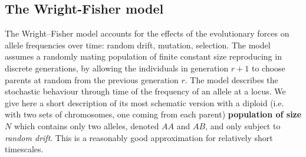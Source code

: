 \documentclass[12pt,mythesisstyle]{report}
\begin{document}
\subsection{The Wright-Fisher model}\label{section: wright-fisher}
The Wright–Fisher model \cite{wright1931} \cite{fisher} \cite{wrightexplained} accounts for the effects of the evolutionary forces on allele frequencies over time: random drift, mutation, selection. The model assumes a randomly mating population of finite constant size reproducing in discrete generations, by allowing the individuals in generation $r + 1$ to choose parents at random from the previous generation $r$. The model describes the stochastic behaviour through time of the frequency of an allele at a locus. We give here a short description of its most schematic version with a diploid (i.e. with two sets of chromosomes, one coming from each parent) \textbf{population of size $N$} which contains only two alleles, denoted $AA$ and $AB$, and only subject to \textit{random drift}. This is a reasonably good approximation for relatively short timescales.
\end{document}
